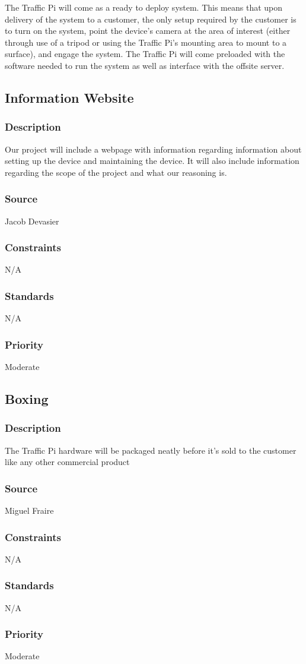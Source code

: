 The Traffic Pi will come as a ready to deploy system. This means that upon delivery of the system to a customer, the only setup required by the customer is to turn on the system, point the device's camera at the area of interest (either through use of a tripod or using the Traffic Pi's mounting area to mount to a surface), and engage the system. The Traffic Pi will come preloaded with the software needed to run the system as well as interface with the offsite server.

\subsection{Information Website}
\subsubsection{Description}
Our project will include a webpage with information regarding information about setting up the device and maintaining the device. It will also include information regarding the scope of the project and what our reasoning is.
\subsubsection{Source}
Jacob Devasier
\subsubsection{Constraints}
N/A
\subsubsection{Standards}
N/A
\subsubsection{Priority}
Moderate

\subsection{Boxing}
\subsubsection{Description}
The Traffic Pi hardware will be packaged neatly before it's sold to the customer like any other commercial product
\subsubsection{Source}
Miguel Fraire
\subsubsection{Constraints}
N/A
\subsubsection{Standards}
N/A
\subsubsection{Priority}
Moderate